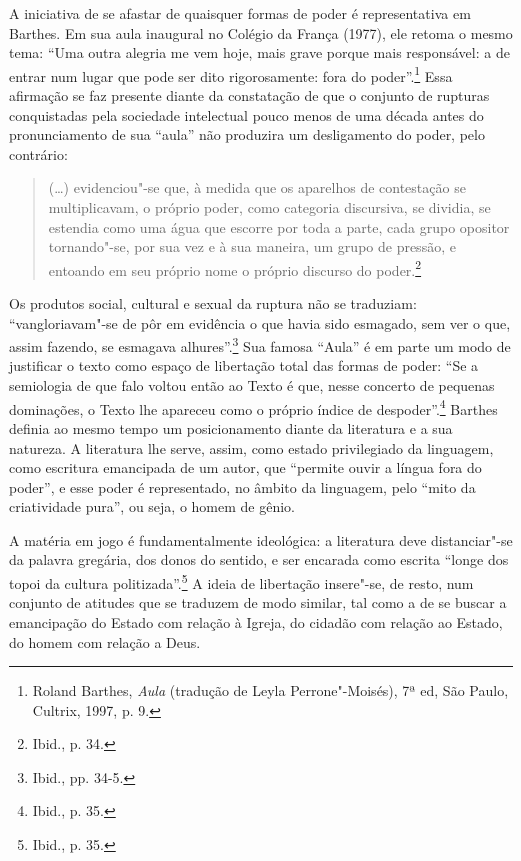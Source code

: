 A iniciativa de se afastar de quaisquer formas de poder é representativa
em Barthes. Em sua aula inaugural no Colégio da França (1977), ele
retoma o mesmo tema: ``Uma outra alegria me vem hoje, mais grave porque
mais responsável: a de entrar num lugar que pode ser dito rigorosamente:
fora do poder''.\footnote{Roland Barthes, \emph{Aula} (tradução de Leyla
  Perrone"-Moisés), 7ª ed, São Paulo, Cultrix, 1997, p.
  9.} Essa afirmação se faz presente diante da constatação de que o
conjunto de rupturas conquistadas pela sociedade intelectual pouco menos
de uma década antes do pronunciamento de sua ``aula'' não produzira um
desligamento do poder, pelo contrário:

\begin{quote}
(\ldots{}) evidenciou"-se que, à medida que os aparelhos de contestação se
multiplicavam, o próprio poder, como categoria discursiva, se dividia,
se estendia como uma água que escorre por toda a parte, cada grupo
opositor tornando"-se, por sua vez e à sua maneira, um grupo de pressão,
e entoando em seu próprio nome o próprio discurso do poder.\footnote{Ibid.,
  p. 34.}
\end{quote}

Os produtos social, cultural e sexual da ruptura não se traduziam:
``vangloriavam"-se de pôr em evidência o que havia sido esmagado, sem ver
o que, assim fazendo, se esmagava alhures''.\footnote{Ibid., pp. 34-5.}
Sua famosa ``Aula'' é em parte um modo de justificar o texto como espaço
de libertação total das formas de poder: ``Se a semiologia de que falo
voltou então ao Texto é que, nesse concerto de pequenas dominações, o
Texto lhe apareceu como o próprio índice de despoder''.\footnote{Ibid.,
  p. 35.} Barthes definia ao mesmo tempo um posicionamento diante da
literatura e a sua natureza. A literatura lhe serve, assim, como estado
privilegiado da linguagem, como escritura emancipada de um autor, que
``permite ouvir a língua fora do poder'', e esse poder é representado,
no âmbito da linguagem, pelo ``mito da criatividade pura'', ou seja, o
homem de gênio.

A matéria em jogo é fundamentalmente ideológica: a literatura deve
distanciar"-se da palavra gregária, dos donos do sentido, e ser encarada
como escrita ``longe dos topoi da cultura politizada''.\footnote{Ibid.,
  p. 35.} A ideia de libertação insere"-se, de resto, num conjunto de
atitudes que se traduzem de modo similar, tal como a de se buscar a
emancipação do Estado com relação à Igreja, do cidadão com relação ao
Estado, do homem com relação a Deus.

